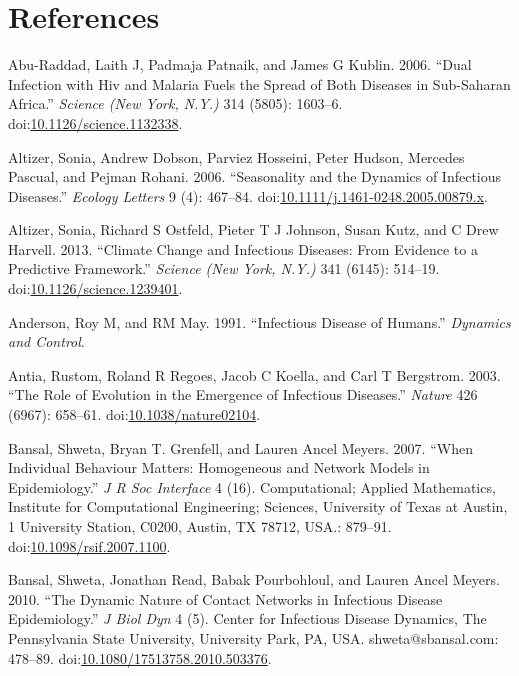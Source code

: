 \documentclass[]{book}
\theoremstyle{definition}
\theoremstyle{definition}
\theoremstyle{definition}
\theoremstyle{remark}
\begin{document}
\section{References}\label{references-19}

\hypertarget{refs}{}
\hypertarget{ref-abu-raddad06}{}
Abu-Raddad, Laith J, Padmaja Patnaik, and James G Kublin. 2006. ``Dual
Infection with Hiv and Malaria Fuels the Spread of Both Diseases in
Sub-Saharan Africa.'' \emph{Science (New York, N.Y.)} 314 (5805):
1603--6.
doi:\href{https://doi.org/10.1126/science.1132338}{10.1126/science.1132338}.

\hypertarget{ref-altizer06}{}
Altizer, Sonia, Andrew Dobson, Parviez Hosseini, Peter Hudson, Mercedes
Pascual, and Pejman Rohani. 2006. ``Seasonality and the Dynamics of
Infectious Diseases.'' \emph{Ecology Letters} 9 (4): 467--84.
doi:\href{https://doi.org/10.1111/j.1461-0248.2005.00879.x}{10.1111/j.1461-0248.2005.00879.x}.

\hypertarget{ref-altizer13}{}
Altizer, Sonia, Richard S Ostfeld, Pieter T J Johnson, Susan Kutz, and C
Drew Harvell. 2013. ``Climate Change and Infectious Diseases: From
Evidence to a Predictive Framework.'' \emph{Science (New York, N.Y.)}
341 (6145): 514--19.
doi:\href{https://doi.org/10.1126/science.1239401}{10.1126/science.1239401}.

\hypertarget{ref-anderson91}{}
Anderson, Roy M, and RM May. 1991. ``Infectious Disease of Humans.''
\emph{Dynamics and Control}.

\hypertarget{ref-antia03}{}
Antia, Rustom, Roland R Regoes, Jacob C Koella, and Carl T Bergstrom.
2003. ``The Role of Evolution in the Emergence of Infectious Diseases.''
\emph{Nature} 426 (6967): 658--61.
doi:\href{https://doi.org/10.1038/nature02104}{10.1038/nature02104}.

\hypertarget{ref-bansal07}{}
Bansal, Shweta, Bryan T. Grenfell, and Lauren Ancel Meyers. 2007. ``When
Individual Behaviour Matters: Homogeneous and Network Models in
Epidemiology.'' \emph{J R Soc Interface} 4 (16). Computational; Applied
Mathematics, Institute for Computational Engineering; Sciences,
University of Texas at Austin, 1 University Station, C0200, Austin, TX
78712, USA.: 879--91.
doi:\href{https://doi.org/10.1098/rsif.2007.1100}{10.1098/rsif.2007.1100}.

\hypertarget{ref-bansal10}{}
Bansal, Shweta, Jonathan Read, Babak Pourbohloul, and Lauren Ancel
Meyers. 2010. ``The Dynamic Nature of Contact Networks in Infectious
Disease Epidemiology.'' \emph{J Biol Dyn} 4 (5). Center for Infectious
Disease Dynamics, The Pennsylvania State University, University Park,
PA, USA. shweta@sbansal.com: 478--89.
doi:\href{https://doi.org/10.1080/17513758.2010.503376}{10.1080/17513758.2010.503376}.
\end{document}
